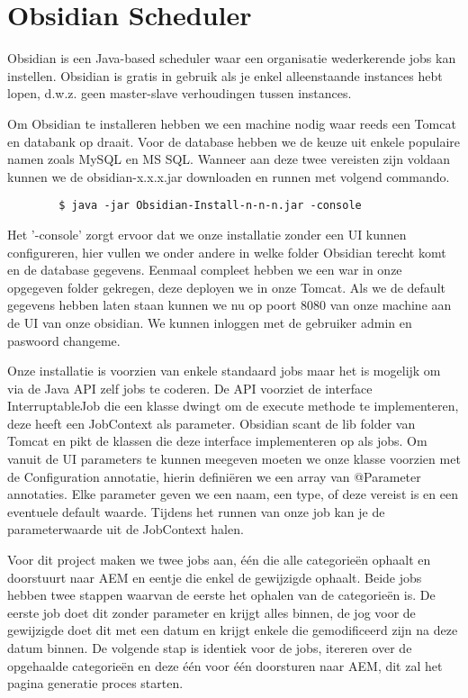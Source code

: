 \documentclass{article}
\begin{document}
	\section{Obsidian Scheduler}
	Obsidian is een Java-based scheduler waar een organisatie wederkerende jobs kan instellen. Obsidian is gratis in gebruik als je enkel alleenstaande instances hebt lopen, d.w.z. geen master-slave verhoudingen tussen instances.
	\par
	Om Obsidian te installeren hebben we een machine nodig waar reeds een Tomcat en databank op draait. Voor de database hebben we de keuze uit enkele populaire namen zoals MySQL en MS SQL. Wanneer aan deze twee vereisten zijn voldaan kunnen we de obsidian-x.x.x.jar downloaden en runnen met volgend commando. 
	\begin{lstlisting}
		$ java -jar Obsidian-Install-n-n-n.jar -console
	\end{lstlisting}
	Het '-console' zorgt ervoor dat we onze installatie zonder een UI kunnen configureren, hier vullen we onder andere in welke folder Obsidian terecht komt en de database gegevens. Eenmaal compleet hebben we een war in onze opgegeven folder gekregen, deze deployen we in onze Tomcat. Als we de default gegevens hebben laten staan kunnen we nu op poort 8080 van onze machine aan de UI van onze obsidian. We kunnen inloggen met de gebruiker admin en paswoord changeme.
	\par
	Onze installatie is voorzien van enkele standaard jobs maar het is mogelijk om via de Java API zelf jobs te coderen. De API voorziet de interface InterruptableJob die een klasse dwingt om de execute methode te implementeren, deze heeft een JobContext als parameter. Obsidian scant de lib folder van Tomcat en pikt de klassen die deze interface implementeren op als jobs. Om vanuit de UI parameters te kunnen meegeven moeten we onze klasse voorzien met de Configuration annotatie, hierin defini\"eren we een array van @Parameter annotaties. Elke parameter geven we een naam, een type, of deze vereist is en een eventuele default waarde. Tijdens het runnen van onze job kan je de parameterwaarde uit de JobContext halen.
	\par
	Voor dit project maken we twee jobs aan, \'e\'en die alle categorie\"en ophaalt en doorstuurt naar AEM en eentje die enkel de gewijzigde ophaalt. Beide jobs hebben twee stappen waarvan de eerste het ophalen van de categorie\"en is. De eerste job doet dit zonder parameter en krijgt alles binnen, de jog voor de gewijzigde doet dit met een datum en krijgt enkele die gemodificeerd zijn na deze datum binnen. De volgende stap is identiek voor de jobs, itereren over de opgehaalde categorieën en deze \'e\'en voor \'e\'en doorsturen naar AEM, dit zal het pagina generatie proces starten.
\end{document}
